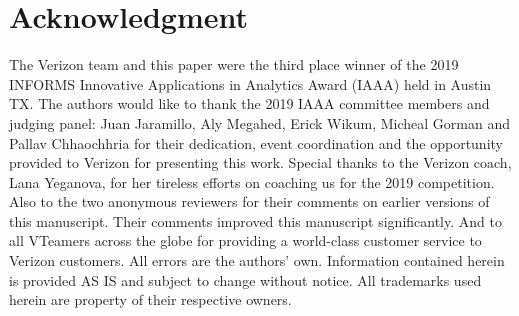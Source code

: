 \documentclass[inte,nonblindrev]{informs3} %
\begin{document}
\section*{Acknowledgment}
The Verizon team and this paper were the third place winner of the 2019 INFORMS Innovative Applications in Analytics Award (IAAA) held in Austin TX. The authors would like to thank the 2019 IAAA committee members and judging panel: Juan Jaramillo, Aly Megahed, Erick Wikum, Micheal Gorman and Pallav Chhaochhria for their dedication, event coordination and the opportunity provided to Verizon for presenting this work. Special thanks to the Verizon coach, Lana Yeganova, for her tireless efforts on coaching us for the 2019 competition. Also to the two anonymous reviewers for their comments on earlier versions of this manuscript. Their comments improved this manuscript significantly. And to all VTeamers across the globe for providing a world-class customer service to Verizon customers. All errors are the authors' own. Information contained herein is provided AS IS and subject to change without notice.  All trademarks used herein are property of their respective owners.
\end{document}
